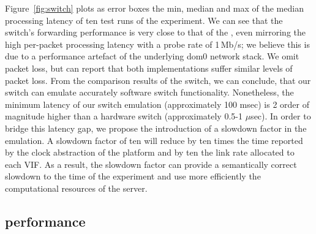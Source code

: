 Figure~\ref{fig:switch} plots as error boxes the min, median and max of the
median processing latency of ten test runs of the experiment. We can see that
the \mirage switch's forwarding performance is very close to that of the \ovs,
even mirroring the high per-packet processing latency with a probe rate of
1\,Mb/s; we believe this is due to a performance artefact of the underlying dom0
network stack. We omit packet loss, but can report that both implementations
suffer similar levels of packet loss.  From the comparison results of the
\mirage \of switch, we can conclude, that our \of switch can emulate accurately 
software
switch functionality. Nonetheless, the minimum latency of our switch emulation
(approximately 100 msec) is 2 order of magnitude higher than a hardware switch
(approximately 0.5-1 $\mu$sec). In order to bridge this latency gap, we propose
the introduction of a slowdown factor in the emulation.  A slowdown factor of
ten will reduce by ten times the time reported by the clock abstraction of the
\mirage platform and by ten the link rate allocated to each VIF\@. As a result,
the slowdown factor can provide a semantically correct slowdown to the time of
the experiment and use more efficiently the computational resources of the
server. 

\subsection{ performance} \label{sec:sdnsim-ns3-perf}

